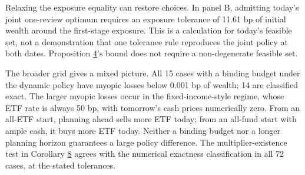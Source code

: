 \documentclass[11pt]{article}
\begin{document}
Relaxing the exposure equality can restore choices. In panel B, admitting today's joint one-review optimum requires an exposure tolerance of 11.61 bp of initial wealth around the first-stage exposure. This is a calculation for today's feasible set, not a demonstration that one tolerance rule reproduces the joint policy at both dates. Proposition \hyperref[res:Proposition-4]{4}'s bound does not require a non-degenerate feasible set.

The broader grid gives a mixed picture. All 15 cases with a binding budget under the dynamic policy have myopic losses below 0.001 bp of wealth; 14 are classified exact. The larger myopic losses occur in the fixed-income-style regime, whose ETF rate is always 50 bp, with tomorrow's cash prices numerically zero. From an all-ETF start, planning ahead sells more ETF today; from an all-fund start with ample cash, it buys more ETF today. Neither a binding budget nor a longer planning horizon guarantees a large policy difference. The multiplier-existence test in Corollary \hyperref[res:Corollary-8]{8} agrees with the numerical exactness classification in all 72 cases, at the stated tolerances.

\clearpage


\end{document}
